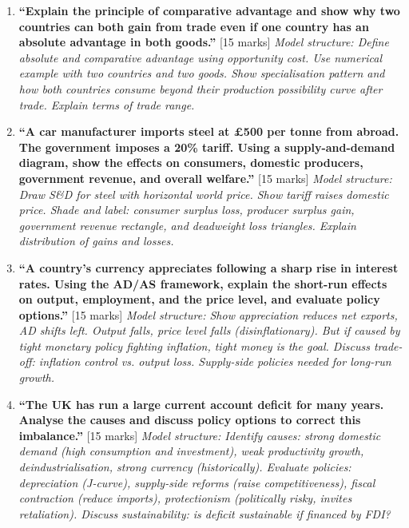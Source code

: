 \documentclass[11pt, a4paper, twoside]{book}
\begin{document}
\begin{exampractice}
\begin{enumerate}[leftmargin=*]
\item \textbf{``Explain the principle of comparative advantage and show why two countries can both gain from trade even if one country has an absolute advantage in both goods.''} [15 marks]
\textit{Model structure: Define absolute and comparative advantage using opportunity cost. Use numerical example with two countries and two goods. Show specialisation pattern and how both countries consume beyond their production possibility curve after trade. Explain terms of trade range.}

\item \textbf{``A car manufacturer imports steel at \pounds500 per tonne from abroad. The government imposes a 20\% tariff. Using a supply-and-demand diagram, show the effects on consumers, domestic producers, government revenue, and overall welfare.''} [15 marks]
\textit{Model structure: Draw S\&D for steel with horizontal world price. Show tariff raises domestic price. Shade and label: consumer surplus loss, producer surplus gain, government revenue rectangle, and deadweight loss triangles. Explain distribution of gains and losses.}

\item \textbf{``A country's currency appreciates following a sharp rise in interest rates. Using the AD/AS framework, explain the short-run effects on output, employment, and the price level, and evaluate policy options.''} [15 marks]
\textit{Model structure: Show appreciation reduces net exports, AD shifts left. Output falls, price level falls (disinflationary). But if caused by tight monetary policy fighting inflation, tight money is the goal. Discuss trade-off: inflation control vs. output loss. Supply-side policies needed for long-run growth.}

\item \textbf{``The UK has run a large current account deficit for many years. Analyse the causes and discuss policy options to correct this imbalance.''} [15 marks]
\textit{Model structure: Identify causes: strong domestic demand (high consumption and investment), weak productivity growth, deindustrialisation, strong currency (historically). Evaluate policies: depreciation (J-curve), supply-side reforms (raise competitiveness), fiscal contraction (reduce imports), protectionism (politically risky, invites retaliation). Discuss sustainability: is deficit sustainable if financed by FDI?}


\end{enumerate}
\end{exampractice}
\end{document}
